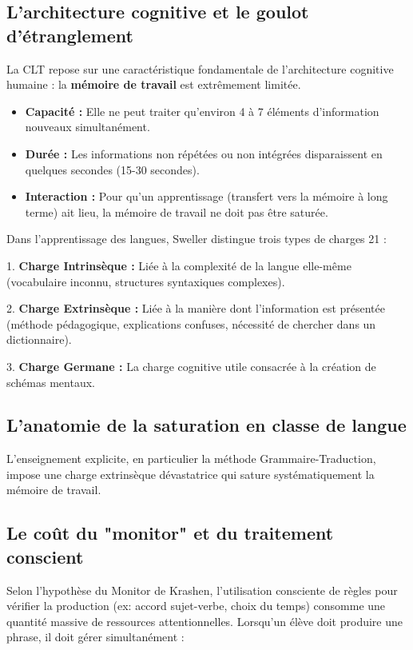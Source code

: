 \subsection{L'architecture cognitive et le goulot d'étranglement}

La CLT repose sur une caractéristique fondamentale de l'architecture cognitive humaine : la
\textbf{mémoire de travail} est extrêmement limitée.

\begin{itemize}\item \textbf{Capacité :} Elle ne peut traiter qu'environ 4 à 7 éléments d'information nouveaux simultanément.\cite{II-2-2-ref20}\item \textbf{Durée :} Les informations non répétées ou non intégrées disparaissent en quelques secondes (15-30 secondes).\item \textbf{Interaction :} Pour qu'un apprentissage (transfert vers la mémoire à long terme) ait lieu, la mémoire de travail ne doit pas être saturée.\end{itemize}Dans l'apprentissage des langues, Sweller distingue trois types de charges 21 :

1. \textbf{Charge Intrinsèque :} Liée à la complexité de la langue elle-même (vocabulaire inconnu,
structures syntaxiques complexes).

2. \textbf{Charge Extrinsèque :} Liée à la manière dont l'information est présentée (méthode
pédagogique, explications confuses, nécessité de chercher dans un dictionnaire).

3. \textbf{Charge Germane :} La charge cognitive utile consacrée à la création de schémas mentaux.



\subsection{L'anatomie de la saturation en classe de langue}

L'enseignement explicite, en particulier la méthode Grammaire-Traduction, impose une charge
extrinsèque dévastatrice qui sature systématiquement la mémoire de travail.



\subsection{Le coût du "monitor" et du traitement conscient}

Selon l'hypothèse du Monitor de Krashen, l'utilisation consciente de règles pour vérifier la
production (ex: accord sujet-verbe, choix du temps) consomme une quantité massive de ressources
attentionnelles.\cite{II-2-2-ref23} Lorsqu'un élève doit produire une phrase, il doit gérer
simultanément :


